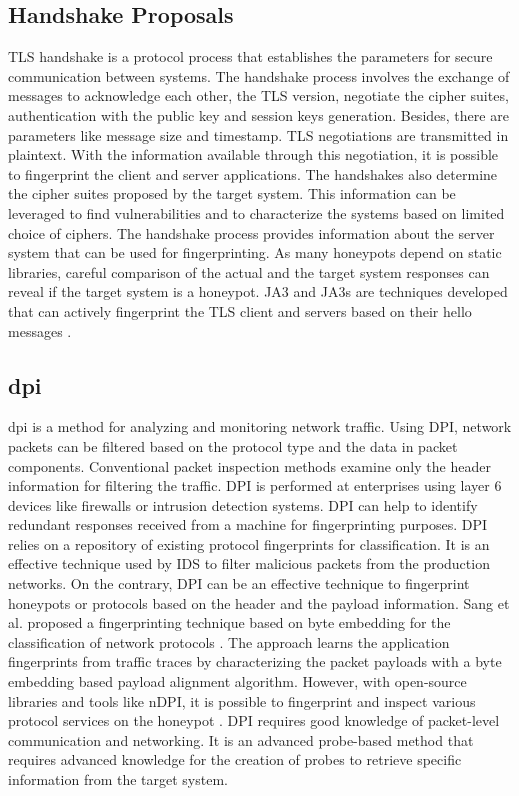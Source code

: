 \subsection{Handshake Proposals}
TLS handshake is a protocol process that establishes the parameters for secure communication between systems. The handshake process involves the exchange of messages to acknowledge each other, the TLS version,  negotiate the cipher suites, authentication with the public key and session keys generation. Besides, there are parameters like message size and timestamp. TLS negotiations are transmitted in plaintext. With the information available through this negotiation, it is possible to fingerprint the client and server applications.  The handshakes also determine the cipher suites proposed by the target system. This information can be leveraged to find vulnerabilities and to characterize the systems based on limited choice of ciphers. The handshake process provides information about the server system that can be used for fingerprinting. As many honeypots depend on static libraries, careful comparison of the actual and the target system responses can reveal if the target system is a honeypot. 
JA3 and JA3s are techniques developed that can actively fingerprint the TLS client and servers based on their hello messages \cite{JA3}. 

\subsection{\acrfull{dpi}}
\acrfull{dpi}  is a method for analyzing and monitoring network traffic. Using DPI, network packets can be filtered based on the protocol type and the data in packet components. Conventional packet inspection methods examine only the header information for filtering the traffic. DPI is performed at enterprises using layer 6 devices like firewalls or intrusion detection systems. DPI can help to identify redundant responses received from a machine for fingerprinting purposes. DPI relies on a repository of existing protocol fingerprints for classification. It is an effective technique used by IDS to filter malicious packets from the production networks. On the contrary, DPI can be an effective technique to fingerprint honeypots or protocols based on the header and the payload information. Sang et al. proposed a fingerprinting technique based on byte embedding for the classification of network protocols \cite{Sang}. The approach learns the application fingerprints from traffic traces by characterizing the packet payloads with a byte embedding based payload alignment algorithm. However, with open-source libraries and tools like nDPI, it is possible to fingerprint and inspect various protocol services on the honeypot \cite{nDPI}. DPI requires good knowledge of packet-level communication and networking. It is an advanced probe-based method that requires advanced knowledge for the creation of probes to retrieve specific information from the target system.  


